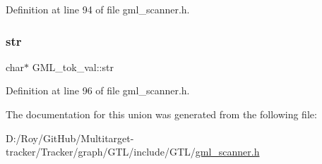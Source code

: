 Definition at line 94 of file gml\+\_\+scanner.\+h.

\mbox{\label{union_g_m_l__tok__val_a219b67b798ce410d353be2cd01f73d0e}} 
\subsubsection{\texorpdfstring{str}{str}}
{\footnotesize\ttfamily char$\ast$ G\+M\+L\+\_\+tok\+\_\+val\+::str}



Definition at line 96 of file gml\+\_\+scanner.\+h.



The documentation for this union was generated from the following file\+:\begin{DoxyCompactItemize}
\item 
D\+:/\+Roy/\+Git\+Hub/\+Multitarget-\/tracker/\+Tracker/graph/\+G\+T\+L/include/\+G\+T\+L/\mbox{\hyperlink{gml__scanner_8h}{gml\+\_\+scanner.\+h}}\end{DoxyCompactItemize}
